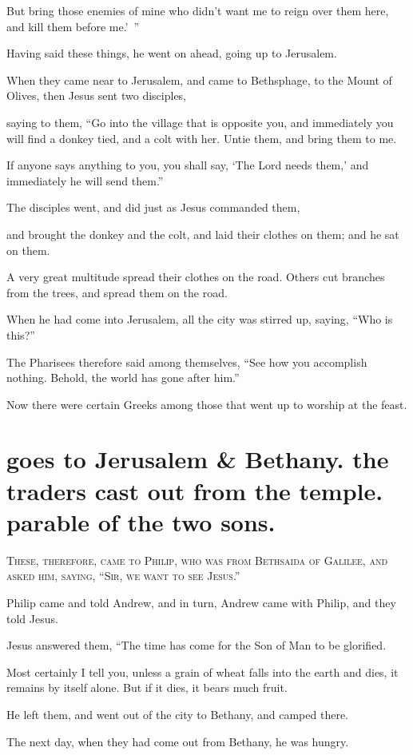But bring those enemies of mine who didn’t want me to reign over them here, and kill them before me.’ ”

Having said these things, he went on ahead, going up to Jerusalem.

When they came near to Jerusalem, and came to Bethsphage, to the Mount of Olives, then Jesus sent two disciples,

saying to them, “Go into the village that is opposite you, and immediately you will find a donkey tied, and a colt with her. Untie them, and bring them to me.

If anyone says anything to you, you shall say, ‘The Lord needs them,’ and immediately he will send them.”

The disciples went, and did just as Jesus commanded them,

and brought the donkey and the colt, and laid their clothes on them; and he sat on them.

A very great multitude spread their clothes on the road. Others cut branches from the trees, and spread them on the road.

When he had come into Jerusalem, all the city was stirred up, saying, “Who is this?”

The Pharisees therefore said among themselves, “See how you accomplish nothing. Behold, the world has gone after him.”

Now there were certain Greeks among those that went up to worship at the feast.


\clearpage \section*{goes to Jerusalem \& Bethany. the traders cast out from the temple. parable of the two sons.}

\lettrine{T}{hese, therefore, came to Philip, who was from Bethsaida of Galilee, and asked him, saying, “Sir, we want to see Jesus.”}

Philip came and told Andrew, and in turn, Andrew came with Philip, and they told Jesus.

Jesus answered them, “The time has come for the Son of Man to be glorified.

Most certainly I tell you, unless a grain of wheat falls into the earth and dies, it remains by itself alone. But if it dies, it bears much fruit.

He left them, and went out of the city to Bethany, and camped there.

The next day, when they had come out from Bethany, he was hungry.

